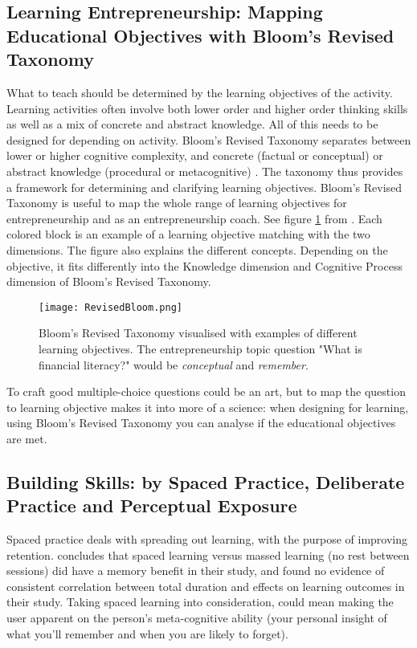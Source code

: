 
  \subsection{Learning Entrepreneurship: Mapping Educational Objectives with Bloom's Revised Taxonomy}

  What to teach should be determined by the learning objectives of the activity. Learning activities often involve both lower order and higher order thinking skills as well as a mix of concrete and abstract knowledge. All of this needs to be designed for depending on activity. Bloom's Revised Taxonomy \citep{krathwohl} separates between lower or higher cognitive complexity, and concrete (factual or conceptual) or abstract knowledge (procedural or metacognitive) \citep{cheong}. The taxonomy thus provides a framework for determining and clarifying learning objectives. Bloom's Revised Taxonomy is useful to map the whole range of learning objectives for entrepreneurship and as an entrepreneurship coach. See figure \ref{fig:revised-bloom} from \cite{heer}. Each colored block is an example of a learning objective matching with the two dimensions. The figure also explains the different concepts. Depending on the objective, it fits differently into the Knowledge dimension and Cognitive Process dimension of Bloom's Revised Taxonomy.

  \begin{figure}[h]
    \centering
    \texttt{[image: RevisedBloom.png]}
    \caption{Bloom's Revised Taxonomy visualised with examples of different learning objectives. The entrepreneurship topic question "What is financial literacy?" would be \textit{conceptual} and \textit{remember}. }
    \label{fig:revised-bloom}
\end{figure}

  To craft good multiple-choice questions could be an art, but to map the question to learning objective makes it into more of a science: when designing for learning, using Bloom's Revised Taxonomy you can analyse if the educational objectives are met.

  \subsection{Building Skills: by Spaced Practice, Deliberate Practice and Perceptual Exposure}

  Spaced practice deals with spreading out learning, with the purpose of improving retention. \cite{gates} concludes that spaced learning versus massed learning (no rest between sessions) did have a memory benefit in their study, and found no evidence of consistent correlation between total duration and effects on learning outcomes in their study. Taking spaced learning into consideration, could mean making the user apparent on the person's meta-cognitive ability (your personal insight of what you'll remember and when you are likely to forget).

